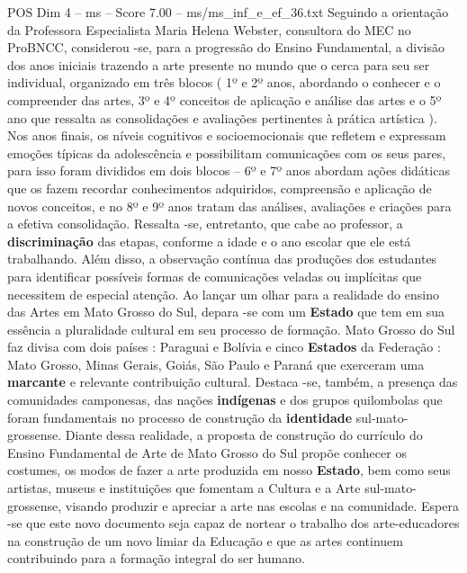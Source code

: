 \begin{textsample}{POS Dim 4 – ms – Score 7.00 – ms/ms\_inf\_e\_ef\_36.txt}
Seguindo a orientação da Professora Especialista Maria Helena Webster, consultora do MEC no ProBNCC, considerou -se, para a progressão do Ensino Fundamental, a divisão dos anos iniciais trazendo a arte presente no mundo que o cerca para seu ser individual, organizado em três blocos ( 1º e 2º anos, abordando o conhecer e o compreender das artes, 3º e 4º conceitos de aplicação e análise das artes e o 5º ano que ressalta as consolidações e avaliações pertinentes à prática artística ).
Nos anos finais, os níveis cognitivos e socioemocionais que refletem e expressam emoções típicas da adolescência e possibilitam comunicações com os seus pares, para isso foram divididos em dois blocos – 6º e 7º anos abordam ações didáticas que os fazem recordar conhecimentos adquiridos, compreensão e aplicação de novos conceitos, e no 8º e 9º anos tratam das análises, avaliações e criações para a efetiva consolidação.
Ressalta -se, entretanto, que cabe ao professor, a \textbf{discriminação} das etapas, conforme a idade e o ano escolar que ele está trabalhando.
Além disso, a observação contínua das produções dos estudantes para identificar possíveis formas de comunicações veladas ou implícitas que necessitem de especial atenção.
Ao lançar um olhar para a realidade do ensino das Artes em Mato Grosso do Sul, depara -se com um \textbf{Estado} que tem em sua essência a pluralidade cultural em seu processo de formação.
Mato Grosso do Sul faz divisa com dois países : Paraguai e Bolívia e cinco \textbf{Estados} da Federação : Mato Grosso, Minas Gerais, Goiás, São Paulo e Paraná que exerceram uma \textbf{marcante} e relevante contribuição cultural.
Destaca -se, também, a presença das comunidades camponesas, das nações \textbf{indígenas} e dos grupos quilombolas que foram fundamentais no processo de construção da \textbf{identidade} sul-mato-grossense.
Diante dessa realidade, a proposta de construção do currículo do Ensino Fundamental de Arte de Mato Grosso do Sul propõe conhecer os costumes, os modos de fazer a arte produzida em nosso \textbf{Estado}, bem como seus artistas, museus e instituições que fomentam a Cultura e a Arte sul-mato-grossense, visando produzir e apreciar a arte nas escolas e na comunidade.
Espera -se que este novo documento seja capaz de nortear o trabalho dos arte-educadores na construção de um novo limiar da Educação e que as artes continuem contribuindo para a formação integral do ser humano.

\end{textsample}
